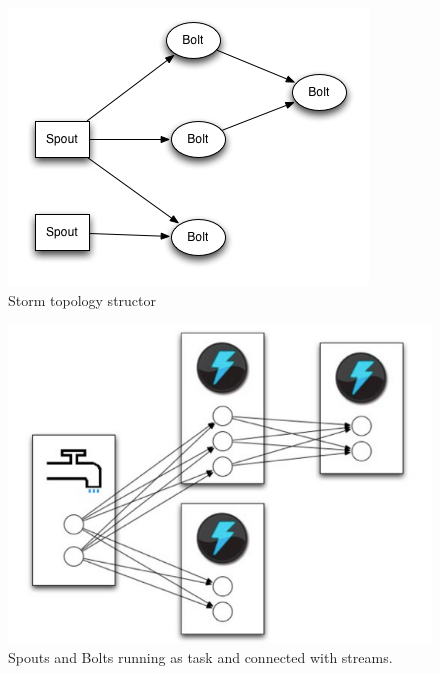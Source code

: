 \documentclass[journal]{IEEEtran/IEEEtran}
\begin{document}
\begin{figure}[htbp]
    \begin{center}
        \includegraphics[scale=0.45]{img/topology.png}
        \caption{Storm topology structor}
        \label{topology}
    \end{center}
\end{figure}

\begin{figure}[htbp]
    \begin{center}
        \includegraphics[scale=0.45]{img/tasks.png}
        \caption{Spouts and Bolts running as task and connected with streams.}
        \label{tasks}
    \end{center}
\end{figure}
\end{document}
